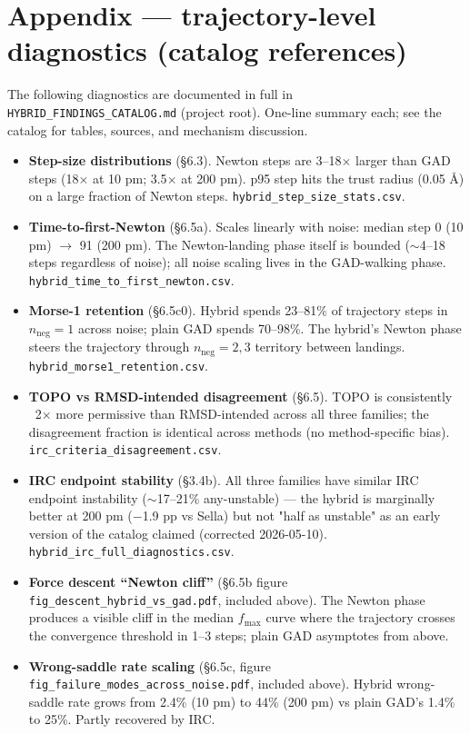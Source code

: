 \documentclass[11pt]{article}
\begin{document}
\section*{Appendix --- trajectory-level diagnostics (catalog references)}

The following diagnostics are documented in full in
\texttt{HYBRID\_FINDINGS\_CATALOG.md} (project root). One-line summary
each; see the catalog for tables, sources, and mechanism discussion.

\begin{itemize}[leftmargin=1.5em, itemsep=0.2em]
\item \textbf{Step-size distributions} (§6.3). Newton steps are
  3--18$\times$ larger than GAD steps (18$\times$ at 10 pm; 3.5$\times$
  at 200 pm). p95 step hits the trust radius (0.05 Å) on a large
  fraction of Newton steps. \texttt{hybrid\_step\_size\_stats.csv}.
\item \textbf{Time-to-first-Newton} (§6.5a). Scales linearly with
  noise: median step 0 (10 pm) $\to$ 91 (200 pm). The Newton-landing
  phase itself is bounded ($\sim$4--18 steps regardless of noise);
  all noise scaling lives in the GAD-walking phase.
  \texttt{hybrid\_time\_to\_first\_newton.csv}.
\item \textbf{Morse-1 retention} (§6.5c0). Hybrid spends 23--81\% of
  trajectory steps in $n_\text{neg}=1$ across noise; plain GAD spends
  70--98\%. The hybrid's Newton phase steers the trajectory through
  $n_\text{neg}=2,3$ territory between landings.
  \texttt{hybrid\_morse1\_retention.csv}.
\item \textbf{TOPO vs RMSD-intended disagreement} (§6.5). TOPO is
  consistently ~2$\times$ more permissive than RMSD-intended across
  all three families; the disagreement fraction is identical across
  methods (no method-specific bias).
  \texttt{irc\_criteria\_disagreement.csv}.
\item \textbf{IRC endpoint stability} (§3.4b). All three families have
  similar IRC endpoint instability ($\sim$17--21\% any-unstable) ---
  the hybrid is marginally better at 200 pm ($-$1.9 pp vs Sella) but
  not "half as unstable" as an early version of the catalog claimed
  (corrected 2026-05-10).
  \texttt{hybrid\_irc\_full\_diagnostics.csv}.
\item \textbf{Force descent ``Newton cliff''} (§6.5b figure
  \texttt{fig\_descent\_hybrid\_vs\_gad.pdf}, included above).
  The Newton phase produces a visible cliff in the median $f_{\max}$
  curve where the trajectory crosses the convergence threshold in
  1--3 steps; plain GAD asymptotes from above.
\item \textbf{Wrong-saddle rate scaling} (§6.5c, figure
  \texttt{fig\_failure\_modes\_across\_noise.pdf}, included above).
  Hybrid wrong-saddle rate grows from 2.4\% (10 pm) to 44\% (200 pm)
  vs plain GAD's 1.4\% to 25\%. Partly recovered by IRC.
\end{itemize}
\end{document}
